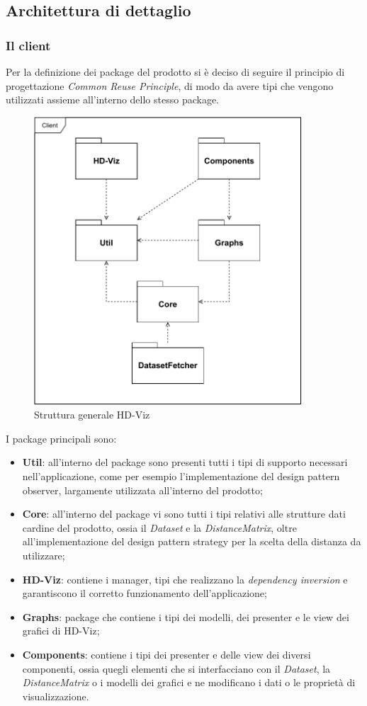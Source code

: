 \documentclass[../manuale_sviluppatore.tex]{subfiles}
\begin{document}
\subsection{Architettura di dettaglio}
\subsubsection{Il client}

Per la definizione dei package del prodotto si è deciso di seguire il principio di progettazione 
\emph{Common Reuse Principle}, di modo da avere tipi che vengono utilizzati assieme all'interno 
dello stesso package.

\begin{figure}[H]
	\centering
	\includegraphics[width=10cm]{src/img/packageDiagramOverview.pdf}
	\caption{Struttura generale HD-Viz}
\end{figure}

I package principali sono:
\begin{itemize}
	\item \textbf{Util}: all'interno del package sono presenti tutti i tipi di supporto necessari 
	nell'applicazione, come per esempio l'implementazione del design pattern observer, largamente 
	utilizzata all'interno del prodotto;
	\item \textbf{Core}: all'interno del package vi sono tutti i tipi relativi alle strutture dati 
	cardine del prodotto, ossia il \emph{Dataset} e la \emph{DistanceMatrix}, oltre 
	all'implementazione del design pattern strategy per la scelta della distanza da utilizzare;
	\item \textbf{HD-Viz}: contiene i manager, tipi che realizzano la \emph{dependency inversion} e 
	garantiscono il corretto funzionamento dell'applicazione;
	\item \textbf{Graphs}: package che contiene i tipi dei modelli, dei presenter e le view dei 
	grafici di HD-Viz;
	\item \textbf{Components}: contiene i tipi dei presenter e delle view dei diversi componenti, 
	ossia quegli elementi che si interfacciano con il \emph{Dataset}, la \emph{DistanceMatrix} o i 
	modelli dei grafici e ne modificano i dati o le proprietà di visualizzazione.
\end{itemize}
\end{document}

